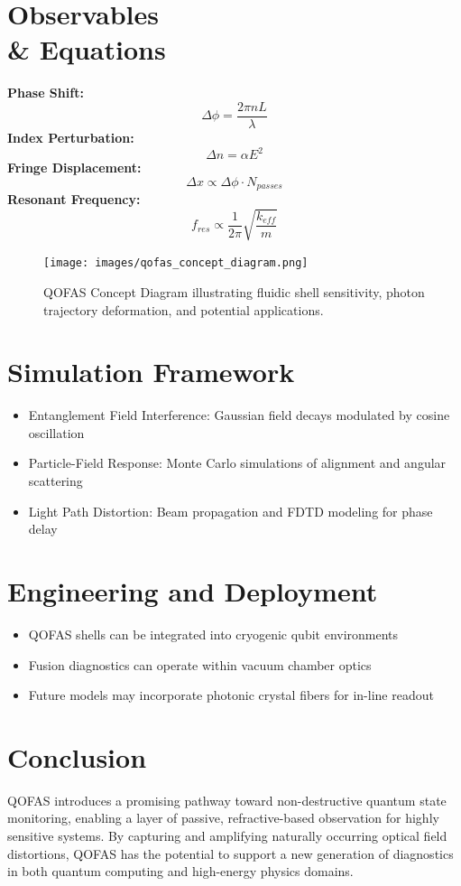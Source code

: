 \documentclass[11pt]{article}
\begin{document}
\section{Observables \\& Equations}
\textbf{Phase Shift:} \[ \Delta \phi = \frac{2 \pi n L}{\lambda} \]
\textbf{Index Perturbation:} \[ \Delta n = \alpha E^2 \]
\textbf{Fringe Displacement:} \[ \Delta x \propto \Delta \phi \cdot N_{passes} \]
\textbf{Resonant Frequency:} \[ f_{res} \propto \frac{1}{2 \pi} \sqrt{\frac{k_{eff}}{m}} \]

\begin{figure}[h!]
  \centering
  \texttt{[image: images/qofas\_concept\_diagram.png]}
  \caption{QOFAS Concept Diagram illustrating fluidic shell sensitivity, photon trajectory deformation, and potential applications.}
  \label{fig:qofas_concept}
\end{figure}

\section{Simulation Framework}
\begin{itemize}
  \item Entanglement Field Interference: Gaussian field decays modulated by cosine oscillation
  \item Particle-Field Response: Monte Carlo simulations of alignment and angular scattering
  \item Light Path Distortion: Beam propagation and FDTD modeling for phase delay
\end{itemize}

\section{Engineering and Deployment}
\begin{itemize}
  \item QOFAS shells can be integrated into cryogenic qubit environments
  \item Fusion diagnostics can operate within vacuum chamber optics
  \item Future models may incorporate photonic crystal fibers for in-line readout
\end{itemize}

\section{Conclusion}
QOFAS introduces a promising pathway toward non-destructive quantum state monitoring, enabling a layer of passive, refractive-based observation for highly sensitive systems. By capturing and amplifying naturally occurring optical field distortions, QOFAS has the potential to support a new generation of diagnostics in both quantum computing and high-energy physics domains.
\end{document}

